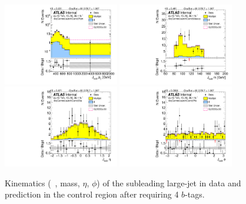 \begin{figure}[htbp!]
\begin{center}
\includegraphics[width=0.45\textwidth,angle=-90]{figures/boosted/Control/b77_FourTag_Control_sublHCand_Pt_m_1.pdf}
\includegraphics[width=0.45\textwidth,angle=-90]{figures/boosted/Control/b77_FourTag_Control_sublHCand_Mass_s.pdf}\\
\includegraphics[width=0.45\textwidth,angle=-90]{figures/boosted/Control/b77_FourTag_Control_sublHCand_Eta.pdf}
\includegraphics[width=0.45\textwidth,angle=-90]{figures/boosted/Control/b77_FourTag_Control_sublHCand_Phi.pdf}
  \caption{Kinematics (\pt~, mass, $\eta$, $\phi$) of the subleading large-\R jet in data and prediction in the control region after requiring 4 $b$-tags. }
  \label{fig:boosted-4b-control-ak10-subl}
\end{center}
\end{figure}


